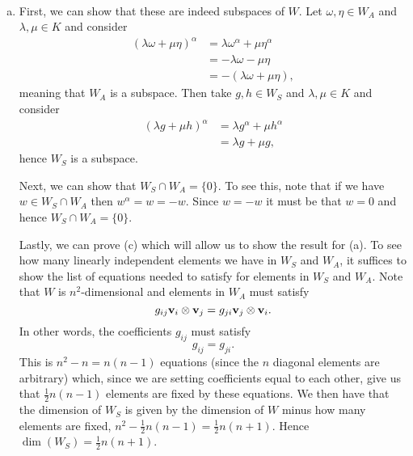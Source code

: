 \documentclass[leqno]{article}
\begin{document}
\begin{solution}~
\begin{enumerate}[(a)]
    \item First, we can show that these are indeed subspaces of $W$. Let $\omega, \eta \in W_A$ and $\lambda,\mu \in K$ and consider
    \begin{align*}
        (\lambda \omega + \mu \eta)^\alpha &= \lambda \omega^\alpha + \mu \eta^\alpha\\
        &= -\lambda \omega - \mu \eta\\
        &= -(\lambda \omega + \mu \eta),
    \end{align*}
    meaning that $W_A$ is a subspace.  Then take $g,h \in W_S$ and $\lambda,\mu \in K$ and consider
    \begin{align*}
        (\lambda g+ \mu h)^\alpha &= \lambda g^\alpha + \mu h^\alpha \\
        &= \lambda g + \mu g,
    \end{align*}
    hence $W_S$ is a subspace.
    
    Next, we can show that $W_S\cap W_A=\{0\}$. To see this, note that if we have $w\in W_S\cap W_A$ then $w^\alpha = w = -w$.  Since $w=-w$ it must be that $w=0$ and hence $W_S\cap W_A=\{0\}$.  
    
    Lastly, we can prove (c) which will allow us to show the result for (a).  To see how many linearly independent elements we have in $W_S$ and $W_A$, it suffices to show the list of equations needed to satisfy for elements in $W_S$ and $W_A$.  Note that $W$ is $n^2$-dimensional and elements in $W_A$ must satisfy
    \[
    g_{ij}\mathbf{v}_i \otimes \mathbf{v}_j = g_{ji}\mathbf{v}_j\otimes \mathbf{v}_i.
    \]
    In other words, the coefficients $g_{ij}$ must satisfy
    \[
    g_{ij}=g_{ji}.
    \]
    This is $n^2-n=n(n-1)$ equations (since the $n$ diagonal elements are arbitrary) which, since we are setting coefficients equal to each other, give us that $\frac{1}{2}n(n-1)$ elements are fixed by these equations.  We then have that the dimension of $W_S$ is given by the dimension of $W$ minus how many elements are fixed, $n^2-\frac{1}{2}n(n-1)=\frac{1}{2}n(n+1)$. Hence $\dim(W_S)=\frac{1}{2}n(n+1)$.
    

\end{enumerate}
\end{solution}
\end{document}
